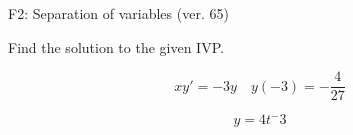\begin{exercise}
  \begin{exerciseTitle}F2: Separation of variables (ver. 65)\end{exerciseTitle}
  \begin{exerciseStatement}
    
Find the solution to the given IVP.

    
\[xy'= -3 y \hspace{1em} y( -3 ) = -\frac{4}{27}\]

  \end{exerciseStatement}
  \begin{exerciseAnswer}
    
\[y= 4 t^ -3\]

  \end{exerciseAnswer}
\end{exercise}